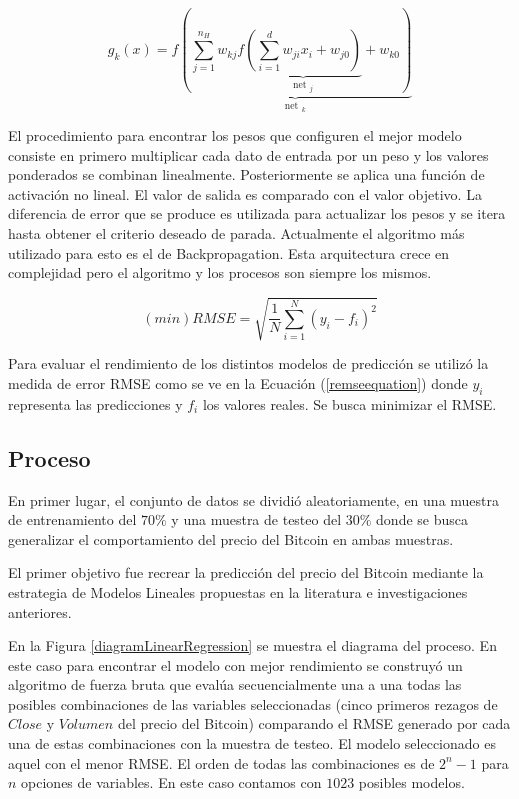 \documentclass[a4paper,12pt,twocolumn]{article}
\begin{document}
\begin{equation}
g_{k}(x)=f \underbrace{(\sum_{j=1}^{n_{H}} w_{k j} f \underbrace{\left(\sum_{i=1}^{d} w_{j i} x_{i}+w_{j 0}\right)}_{\text {net }_{j}}+w_{k 0})}_{\text {net }_{k}}
\label{ecuacionRedes}
\end{equation}

El procedimiento para encontrar los pesos que configuren el mejor modelo consiste en primero multiplicar cada dato de entrada por un peso y los valores ponderados se combinan linealmente. Posteriormente se aplica una función de activación no lineal. El valor de salida es comparado con el valor objetivo. La diferencia de error que se produce es utilizada para actualizar los pesos y se itera hasta obtener el criterio deseado de parada. Actualmente el algoritmo más utilizado para esto es el de Backpropagation. Esta arquitectura crece en complejidad pero el algoritmo y los procesos son siempre los mismos. 

\begin{equation}
(min)RMSE=\sqrt{\frac{1}{N} \sum_{i=1}^{N}\left(y_{i}-f_{i}\right)^{2}}
\label{remseequation}
\end{equation}

Para evaluar el rendimiento de los distintos modelos de predicción se utilizó la medida de error RMSE como se ve en la Ecuación (\ref{remseequation}) donde $y_i$ representa las predicciones y $f_i$ los valores reales. Se busca minimizar el RMSE.

\subsection{Proceso}

En primer lugar, el conjunto de datos se dividió aleatoriamente, en una muestra de entrenamiento del $70\%$ y una muestra de testeo del $30\%$ donde se busca generalizar el comportamiento del precio del Bitcoin en ambas muestras.

El primer objetivo fue recrear la predicción del precio del Bitcoin mediante la estrategia de Modelos Lineales propuestas en la literatura e investigaciones anteriores. 

En la Figura \ref{diagramLinearRegression} se muestra el diagrama del proceso. En este caso para encontrar el modelo con mejor rendimiento se construyó un algoritmo de fuerza bruta que evalúa secuencialmente una a una todas las posibles combinaciones de las variables seleccionadas (cinco primeros rezagos de $Close$ y $Volumen$ del precio del Bitcoin) comparando el RMSE generado por cada una de estas combinaciones con la muestra de testeo. El modelo seleccionado es aquel con el menor RMSE. El orden de todas las combinaciones es de $2^n - 1$ para $n$ opciones de variables. En este caso contamos con $1023$ posibles modelos.
\end{document}
